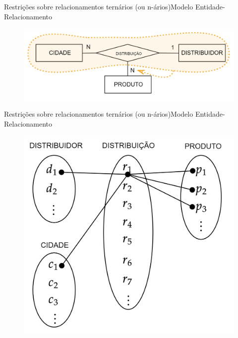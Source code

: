 \documentclass[t]{beamer}
\begin{document}

\begin{ftst}{Restrições sobre relacionamentos ternários
(ou n-ários)}{Modelo Entidade-Relacionamento}

\begin{figure}
    \centering
    \includegraphics[scale=0.2]{Figuras/01_28.png}
\end{figure}

\end{ftst}


\begin{ftst}{Restrições sobre relacionamentos ternários
(ou n-ários)}{Modelo Entidade-Relacionamento}

\begin{figure}
    \centering
    \includegraphics[scale=0.16]{Figuras/01_30.png}
\end{figure}

\end{ftst}
\end{document}
